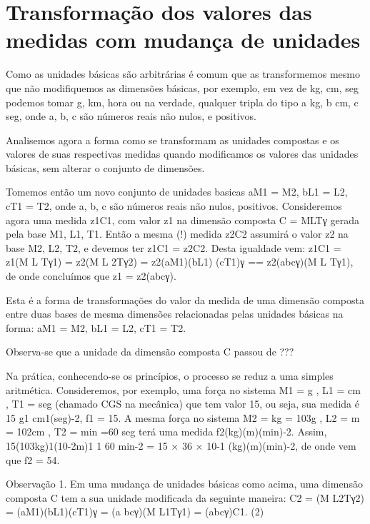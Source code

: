 \section{Transformação dos valores das medidas com mudança de unidades}

Como as unidades básicas são arbitrárias é comum que as transformemos mesmo que não modifiquemos as dimensões básicas, por exemplo, em vez de {kg, cm, seg} podemos tomar {g, km, hora} ou na verdade, qualquer tripla do tipo {a kg, b cm, c seg}, onde a, b, c são números reais não nulos, e positivos.

Analisemos agora a forma como se transformam as unidades compostas e os valores de suas respectivas medidas quando modificamos os valores das unidades básicas, sem alterar o conjunto de dimensões.

Tomemos então um novo conjunto de unidades basicas {aM1 = M2, bL1 = L2, cT1 = T2}, onde a, b, c são números reais não nulos, positivos. Consideremos agora uma medida z1C1, com valor z1 na dimensão composta C = M\alpha L\beta Tγ gerada pela base {M1, L1, T1}. Então a mesma (!) medida z2C2 assumirá o valor z2 na base {M2, L2, T2}, e devemos ter z1C1 = z2C2. Desta igualdade vem:
z1C1 = z1(M L Tγ1) = z2(M L \beta2Tγ2) = z2(aM1)\alpha (bL1) \beta (cT1)γ == z2(a\alpha b\beta cγ)(M L  Tγ1),
de onde concluímos que z1 = z2(a\alpha b\beta cγ).

Esta é a forma de transformações do valor da medida de uma dimensão composta entre duas bases de mesma dimensões relacionadas pelas unidades básicas na forma:
aM1 = M2, bL1 = L2, cT1 = T2.

Observa-se que a unidade da dimensão composta C passou de ???

Na prática, conhecendo-se os princípios, o processo se reduz a uma simples aritmética. Consideremos, por exemplo, uma força no sistema {M1 = g , L1 = cm , T1 = seg} (chamado CGS na mecânica) que tem valor 15, ou seja, sua medida é 15 g1 cm1(seg)-2, f1 = 15. A mesma força no sistema {M2 = kg = 103g , L2 = m = 102cm , T2 = min =60 seg} terá uma medida f2(kg)(m)(min)-2. Assim, 15(103kg)1(10-2m)1 1 60 min-2 = 15 × 36 × 10-1 (kg)(m)(min)-2,
de onde vem que f2 = 54.

Observação 1. Em uma mudança de unidades básicas como acima, uma dimensão composta C tem a sua unidade modificada da seguinte maneira:
C2 = (M L\beta2Tγ2) = (aM1)\alpha(bL1)\beta(cT1)γ = (a \alpha b\beta cγ)(M L\beta1Tγ1) = (a\alpha b\beta cγ)C1. (2)

